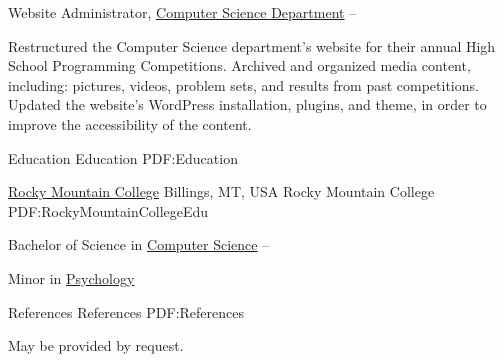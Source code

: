 \documentclass[letterpaper,MMMyyyy,nonstopmode]{simpleresumecv}
\begin{document}
\begin{Body}
\Gap

\Entry
Website Administrator,
\href{http://cs.rocky.edu/programming-competitions/high-school-competions/}
{Computer Science Department}
\hfill
{} --
\begin{Detail}
\BulletItem
Restructured the Computer Science department's website for their annual High School Programming Competitions.
\BulletItem
Archived and organized media content, including: pictures, videos, problem sets, and results from past competitions.
\BulletItem
Updated the website's WordPress installation, plugins, and theme, in order to improve the accessibility of the content.
\end{Detail}


\Section
{Education}
{Education}
{PDF:Education}

\SubSection
{\href{http://www.rocky.edu/}
{Rocky Mountain College}
\hfill Billings, MT, USA}
{Rocky Mountain College}
{PDF:RockyMountainCollegeEdu}

\Gap

\Entry
Bachelor of Science in
\href{http://cs.rocky.edu/}
{Computer Science}
\hfill
{} --
\begin{Detail}
\BulletItem
Minor in 
\href{http://rocky.edu/academics/academic-programs/undergraduate-majors/psychology/}
{Psychology}
\end{Detail}


\Section
{References}
{References}
{PDF:References}

May be provided by request.

\end{Body}
\end{document}
